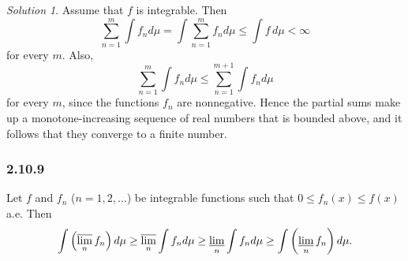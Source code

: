 \documentclass{report}
\theoremstyle{remark}
\newtheorem*{solution}{Solution}
\begin{document}
\begin{solution}
  Assume that $f$ is integrable. Then
  \begin{equation*}
    \sum_{n=1}^m \int f_n d\mu = \int \sum_{n=1}^m f_n d\mu \le \int f \, d\mu < \infty
  \end{equation*}
  for every $m$. Also,
  \begin{equation*}
    \sum_{n=1}^m \int f_n d\mu \le \sum_{n=1}^{m+1} \int f_n d\mu
  \end{equation*}
  for every $m$, since the functions $f_n$ are nonnegative. Hence the partial sums make up a monotone-increasing sequence of real numbers that is bounded above, and it follows that they converge to a finite number.
\end{solution}

\subsubsection*{2.10.9}
Let $f$ and $f_n$ ($n = 1,2,\dots$) be integrable functions such that $0 \le f_n(x) \le f(x)$ a.e. Then
\begin{equation*}
  \int \left( \varlimsup_n f_n \right) d\mu \ge \varlimsup_n \int f_n d\mu \ge \varliminf_n \int f_n d\mu \ge \int \left( \varliminf_n f_n \right) d\mu.
\end{equation*}
\end{document}
